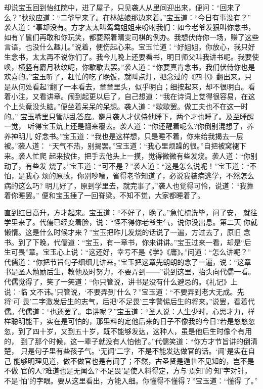 却说宝玉回到怡红院中，进了屋子，只见袭人从里间迎出来，便问：“回来了
么？”秋纹应道：“二爷早来了。在林姑娘那边来着。”宝玉道：“今日有事没有？”
袭人道：“事却没有。方才太太叫鸳鸯姐姐来吩咐我们：如今老爷发狠叫你念书，
如有丫鬟们再敢和你玩笑，都要照着晴雯司棋的例办。我想伏侍你一场，赚了这些
言语，也没什么趣儿。”说着，便伤起心来。宝玉忙道：“好姐姐，你放心，我只好
生念书，太太再不说你们了。我今儿晚上还要看书，明日师父叫我讲书呢。我要使
唤，横竖有麝月秋纹呢，你歇歇去罢。”袭人道：“你要真肯念书，我们伏侍你也是
欢喜的。”宝玉听了，赶忙的吃了晚饭，就叫点灯，把念过的《四书》翻出来。只
是从何处看起?翻了一本看去，章章里头，似乎明白；细按起来，却不很明白。看
着小注，又看讲章。闹到起更以后了，自己想道：“我在诗词上觉得很容易，在这
个上头竟没头脑。”便坐着呆呆的呆想。袭人道：“歇歇罢。做工夫也不在这一时的。”
宝玉嘴里只管胡乱答应。麝月袭人才伏侍他睡下，两个才也睡了。及至睡醒一觉，
听得宝玉炕上还是翻来覆去。袭人道：“你还醒着呢么?你倒别混想了，养养神明儿
好念书。”宝玉道：“我也是这样想，只是睡不着，你来给我揭去一层被。”袭人道：
“天气不热，别揭罢。”宝玉道：“我心里烦躁的很。”自把被窝褪下来。袭人忙爬
起来按住，把手去他头上一摸，觉得微微有些发烧。袭人道：“你别动了，有些发
烧了。”宝玉道：“可不是？”袭人道：“这是怎么说呢！”宝玉道：“不怕，是我心
烦的原故，你别吵嚷，省得老爷知道了，必说我装病逃学，不然怎么病的这么巧?
明儿好了，原到学里去，就完事了。”袭人也觉得可怜，说道：“我靠着你睡罢。”
便和宝玉捶了一回脊梁。不知不觉，大家都睡着了。

直到红日高升，方才起来。宝玉道：“不好了，晚了。”急忙梳洗毕，问了安，
就往学里来了。代儒已经变着脸，说：“怪不得你老爷生气，说你没出息。第二天
你就懒惰。这是什么时候才来？”宝玉把昨儿发烧的话说了一遍，方过去了，原旧
念书。到了下晚，代儒道：“宝玉，有一章书，你来讲讲。”宝玉过来一看，却是“后
生可畏”章。宝玉心上说：“这还好，幸亏不是《学》《庸》。”问道：“怎么讲呢？”
代儒道：“你把节旨句子细细儿讲来。”宝玉把这章先朗朗的念了一遍，说：“这章
书是圣人勉励后生，教他及时努力，不要弄到——”说到这里，抬头向代儒一看。
代儒觉得了，笑了一笑道：“你只管说，讲书是没有什么避忌的。《礼记》上说：‘临
文不讳。’只管说，‘不要弄到’什么？”宝玉道：“不要弄到老大无成。先将‘可
畏’二字激发后生的志气，后把‘不足畏’三字警惕后生的将来。”说罢，看着代
儒。代儒道：“也还罢了。串讲呢？”宝玉道：“圣人说：人生少时，心思才力，样
样聪明能干，实在是可怕的，那里料的定他后来的日子不像我的今日?若是悠悠忽
忽，到了四十岁，又到五十岁，既不能够发达，这种人，虽是他后生时像个有用的，
到了那个时候，这一辈子就没有人怕他了。”代儒笑道：“你方才节旨讲的倒清楚，
只是句子里有些孩子气。‘无闻’二字，不是不能发达做官的话。‘闻’是实在自己
能够明理见道，做不做官也是有闻了；不然，古圣贤是遁世不见知的，岂不是不做
官的人?难道也是无闻么?‘不足畏’是使人料得定，方与‘焉知’的‘知’字对针，
不是‘怕’的字眼。要从这里看出，方能入细。你懂得不懂得？”宝玉道：“懂得
了。”

